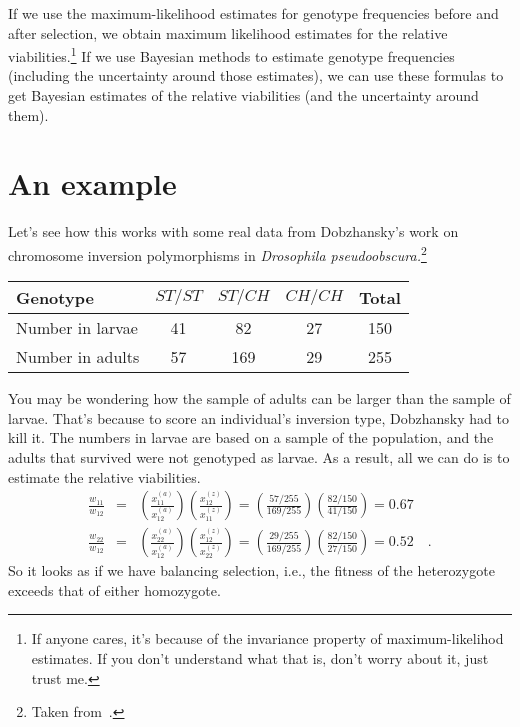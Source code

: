\documentclass[12pt]{article}
\begin{document}
If we use the maximum-likelihood estimates for genotype frequencies
before and after selection, we obtain maximum likelihood estimates for
the relative viabilities.\footnote{If anyone cares, it's because of
  the invariance property of maximum-likelihod estimates. If you don't
  understand what that is, don't worry about it, just trust me.} If we
use Bayesian methods to estimate genotype frequencies (including the
uncertainty around those estimates), we can use these formulas to get
Bayesian estimates of the relative viabilities (and the uncertainty
around them).

\section*{An example}

Let's see how this works with some real data from Dobzhansky's work on
chromosome inversion polymorphisms in {\it Drosophila
pseudoobscura.}\footnote{Taken from~\cite{Dobzhansky-1947}.}

\begin{center}
\begin{tabular}{l|ccc|c}
\hline\hline
Genotype & $ST/ST$ & $ST/CH$ & $CH/CH$ & Total \\
\hline
Number in larvae & 41 & 82 & 27 & 150 \\
Number in adults & 57 & 169 & 29 & 255 \\
\hline
\end{tabular}
\end{center}

You may be wondering how the sample of adults can be larger than the
sample of larvae. That's because to score an individual's inversion
type, Dobzhansky had to kill it. The numbers in larvae are based on a
sample of the population, and the adults that survived were not
genotyped as larvae. As a result, all we can do is to estimate the
relative viabilities.
\begin{eqnarray*}
\frac{w_{11}}{w_{12}} &=& \left(\frac{x_{11}^{(a)}}{x_{12}^{(a)}}\right)
                          \left(\frac{x_{12}^{(z)}}{x_{11}^{(z)}}\right)
= \left(\frac{57/255}{169/255}\right)
  \left(\frac{82/150}{41/150}\right)
= 0.67 \\
\frac{w_{22}}{w_{12}} &=& \left(\frac{x_{22}^{(a)}}{x_{12}^{(a)}}\right)
                          \left(\frac{x_{12}^{(z)}}{x_{22}^{(z)}}\right)
= \left(\frac{29/255}{169/255}\right)
  \left(\frac{82/150}{27/150}\right)
= 0.52 \quad .
\end{eqnarray*}
So it looks as if we have balancing selection, i.e., the fitness of
the heterozygote exceeds that of either homozygote.
\end{document}
